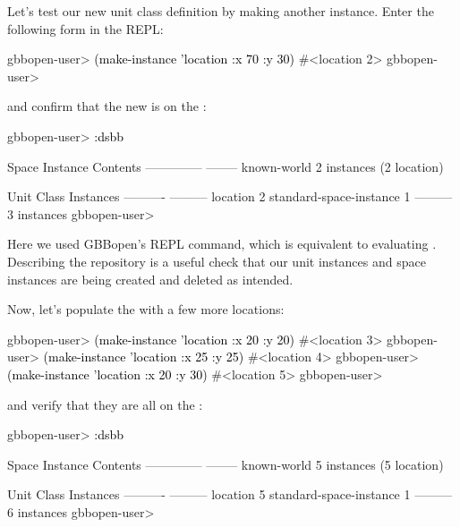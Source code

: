 \documentclass[10pt,twoside,english,pdftex]{article}
\begin{document}
%
%
%
Let's test our new  unit class definition by making
another instance.  Enter the following form in the REPL:
%
\W\supp
\begin{example}
\textcolor{darkergray}{%
  gbbopen-user> \textcolor{black}{(make-instance 'location :x 70 :y 30)}
  #<location 2>
  gbbopen-user>}
\end{example}
%
%
%
and confirm that the new  is on the
:
%
\W\supp\notpretop
\begin{example}
\textcolor{darkergray}{%
  gbbopen-user> \textcolor{black}{:dsbb}
  
  Space Instance                Contents
  --------------                --------
  known-world                   2 instances (2 location)

  Unit Class                    Instances
  ----------                    ---------
  location                              2
  standard-space-instance               1
                                ---------
                                        3 instances
  gbbopen-user>}
\end{example}
%
Here we used GBBopen's  REPL command, which is equivalent to
evaluating .  Describing the
repository is a useful check that our unit instances and space instances are
being created and deleted as intended.

%
%
Now, let's populate the  with a few more locations:
%
\W\supp
\begin{example}
\textcolor{darkergray}{%
  gbbopen-user> \textcolor{black}{(make-instance 'location :x 20 :y 20)}
  #<location 3>
  gbbopen-user> \textcolor{black}{(make-instance 'location :x 25 :y 25)}
  #<location 4>
  gbbopen-user> \textcolor{black}{(make-instance 'location :x 20 :y 30)}
  #<location 5>
  gbbopen-user>}
\end{example}
%
%
%
and verify that they are all on the :
%
\W\supp\notpretop
\begin{example}
\textcolor{darkergray}{%
  gbbopen-user> \textcolor{black}{:dsbb}
  
  Space Instance                Contents
  --------------                --------
  known-world                   5 instances (5 location)

  Unit Class                    Instances
  ----------                    ---------
  location                              5
  standard-space-instance               1
                                ---------
                                        6 instances
  gbbopen-user>}
\end{example}
\end{document}
